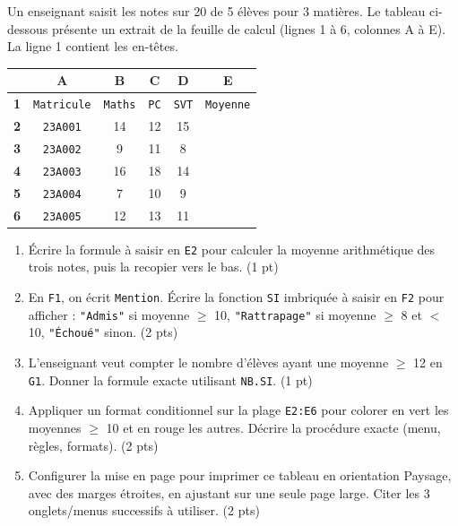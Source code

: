 \documentclass[11pt]{article}
\begin{document}
\begin{exercice}
Un enseignant saisit les notes sur 20 de 5 élèves pour 3 matières. Le tableau ci-dessous présente un extrait de la feuille de calcul (lignes 1 à 6, colonnes A à E). La ligne 1 contient les en-têtes.

\begin{tabular}{|c|c|c|c|c|c|}
\hline
 & \textbf{A} & \textbf{B} & \textbf{C} & \textbf{D} & \textbf{E} \\
\hline
\textbf{1} & \texttt{Matricule} & \texttt{Maths} & \texttt{PC} & \texttt{SVT} & \texttt{Moyenne} \\
\hline
\textbf{2} & \texttt{23A001} & 14 & 12 & 15 & \\
\hline
\textbf{3} & \texttt{23A002} & 9 & 11 & 8 & \\
\hline
\textbf{4} & \texttt{23A003} & 16 & 18 & 14 & \\
\hline
\textbf{5} & \texttt{23A004} & 7 & 10 & 9 & \\
\hline
\textbf{6} & \texttt{23A005} & 12 & 13 & 11 & \\
\hline
\end{tabular}

\begin{enumerate}
\item Écrire la formule à saisir en \texttt{E2} pour calculer la moyenne arithmétique des trois notes, puis la recopier vers le bas. (1 pt)
\item En \texttt{F1}, on écrit \texttt{Mention}. Écrire la fonction \texttt{SI} imbriquée à saisir en \texttt{F2} pour afficher : \texttt{"Admis"} si moyenne $\ge$ 10, \texttt{"Rattrapage"} si moyenne $\ge$ 8 et $<$ 10, \texttt{"Échoué"} sinon. (2 pts)
\item L'enseignant veut compter le nombre d'élèves ayant une moyenne $\ge$ 12 en \texttt{G1}. Donner la formule exacte utilisant \texttt{NB.SI}. (1 pt)
\item Appliquer un format conditionnel sur la plage \texttt{E2:E6} pour colorer en vert les moyennes $\ge$ 10 et en rouge les autres. Décrire la procédure exacte (menu, règles, formats). (2 pts)
\item Configurer la mise en page pour imprimer ce tableau en orientation Paysage, avec des marges étroites, en ajustant sur une seule page large. Citer les 3 onglets/menus successifs à utiliser. (2 pts)
\end{enumerate}
\end{exercice}
\end{document}
